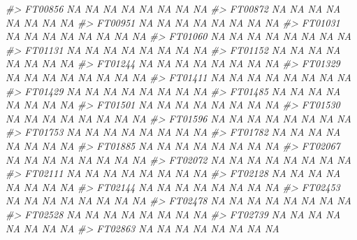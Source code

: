 \documentclass[
]{article}
\newenvironment{Shaded}{\begin{snugshade}}{\end{snugshade}}
\newcommand{\CommentTok}[1]{\textcolor[rgb]{0.56,0.35,0.01}{\textit{#1}}}
\begin{document}
\begin{Shaded}
\begin{Highlighting}[]
\CommentTok{#> FT00856          NA       NA      NA        NA       NA       NA    NA    NA}
\CommentTok{#> FT00872          NA       NA      NA        NA       NA       NA    NA    NA}
\CommentTok{#> FT00951          NA       NA      NA        NA       NA       NA    NA    NA}
\CommentTok{#> FT01031          NA       NA      NA        NA       NA       NA    NA    NA}
\CommentTok{#> FT01060          NA       NA      NA        NA       NA       NA    NA    NA}
\CommentTok{#> FT01131          NA       NA      NA        NA       NA       NA    NA    NA}
\CommentTok{#> FT01152          NA       NA      NA        NA       NA       NA    NA    NA}
\CommentTok{#> FT01244          NA       NA      NA        NA       NA       NA    NA    NA}
\CommentTok{#> FT01329          NA       NA      NA        NA       NA       NA    NA    NA}
\CommentTok{#> FT01411          NA       NA      NA        NA       NA       NA    NA    NA}
\CommentTok{#> FT01429          NA       NA      NA        NA       NA       NA    NA    NA}
\CommentTok{#> FT01485          NA       NA      NA        NA       NA       NA    NA    NA}
\CommentTok{#> FT01501          NA       NA      NA        NA       NA       NA    NA    NA}
\CommentTok{#> FT01530          NA       NA      NA        NA       NA       NA    NA    NA}
\CommentTok{#> FT01596          NA       NA      NA        NA       NA       NA    NA    NA}
\CommentTok{#> FT01753          NA       NA      NA        NA       NA       NA    NA    NA}
\CommentTok{#> FT01782          NA       NA      NA        NA       NA       NA    NA    NA}
\CommentTok{#> FT01885          NA       NA      NA        NA       NA       NA    NA    NA}
\CommentTok{#> FT02067          NA       NA      NA        NA       NA       NA    NA    NA}
\CommentTok{#> FT02072          NA       NA      NA        NA       NA       NA    NA    NA}
\CommentTok{#> FT02111          NA       NA      NA        NA       NA       NA    NA    NA}
\CommentTok{#> FT02128          NA       NA      NA        NA       NA       NA    NA    NA}
\CommentTok{#> FT02144          NA       NA      NA        NA       NA       NA    NA    NA}
\CommentTok{#> FT02453          NA       NA      NA        NA       NA       NA    NA    NA}
\CommentTok{#> FT02478          NA       NA      NA        NA       NA       NA    NA    NA}
\CommentTok{#> FT02528          NA       NA      NA        NA       NA       NA    NA    NA}
\CommentTok{#> FT02739          NA       NA      NA        NA       NA       NA    NA    NA}
\CommentTok{#> FT02863          NA       NA      NA        NA       NA       NA    NA    NA}

\end{Highlighting}
\end{Shaded}
\end{document}
